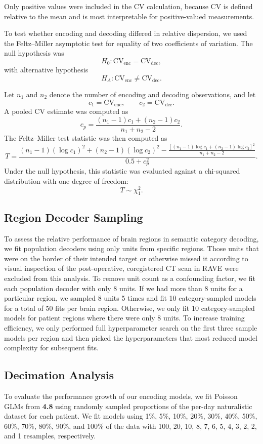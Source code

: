 \documentclass[pdflatex,sn-basic]{sn-jnl}%
\theoremstyle{thmstyleone}%
\theoremstyle{thmstyletwo}%
\theoremstyle{thmstylethree}%
\begin{document}
Only positive values were included in the CV calculation, because CV is defined relative to the mean and is most interpretable for positive-valued measurements.

To test whether encoding and decoding differed in relative dispersion, we used the Feltz--Miller asymptotic test for equality of two coefficients of variation. The null hypothesis was
\[
H_0:
\mathrm{CV}_{\mathrm{enc}}
=
\mathrm{CV}_{\mathrm{dec}},
\]
with alternative hypothesis
\[
H_A:
\mathrm{CV}_{\mathrm{enc}}
\neq
\mathrm{CV}_{\mathrm{dec}}.
\]

Let \(n_1\) and \(n_2\) denote the number of encoding and decoding observations, and let
\[
c_1 = \mathrm{CV}_{\mathrm{enc}},
\qquad
c_2 = \mathrm{CV}_{\mathrm{dec}}.
\]
A pooled CV estimate was computed as
\[
c_p =
\frac{(n_1 - 1)c_1 + (n_2 - 1)c_2}
{n_1 + n_2 - 2}.
\]
The Feltz--Miller test statistic was then computed as
\[
T =
\frac{
(n_1 - 1)(\log c_1)^2
+
(n_2 - 1)(\log c_2)^2
-
\frac{
\left[
(n_1 - 1)\log c_1
+
(n_2 - 1)\log c_2
\right]^2
}
{n_1 + n_2 - 2}
}
{
0.5 + c_p^2
}.
\]
Under the null hypothesis, this statistic was evaluated against a chi-squared distribution with one degree of freedom:
\[
T \sim \chi^2_1.
\]

\subsection{Region Decoder Sampling}\label{subsec21}
To assess the relative performance of brain regions in semantic category decoding, we fit population decoders using only units from specific regions. Those units that were on the border of their intended target or otherwise missed it according to visual inspection of the post-operative, coregistered CT scan in RAVE \citep{bib88} were excluded from this analysis. To remove unit count as a confounding factor, we fit each population decoder with only 8 units. If we had more than 8 units for a particular region, we sampled 8 units 5 times and fit 10 category-sampled models for a total of 50 fits per brain region. Otherwise, we only fit 10 category-sampled models for patient regions where there were only 8 units. To increase training efficiency, we only performed full hyperparameter search on the first three sample models per region and then picked the hyperparameters that most reduced model complexity for subsequent fits. 

\subsection{Decimation Analysis}\label{subsec22}
To evaluate the performance growth of our encoding models, we fit Poisson GLMs from \textbf{4.8} using randomly sampled proportions of the per-day naturalistic dataset for each patient. We fit models using 1\%, 5\%, 10\%, 20\%, 30\%, 40\%, 50\%, 60\%, 70\%, 80\%, 90\%, and 100\% of the data with 100, 20, 10, 8, 7, 6, 5, 4, 3, 2, 2, and 1 resamples, respectively. 
\end{document}

